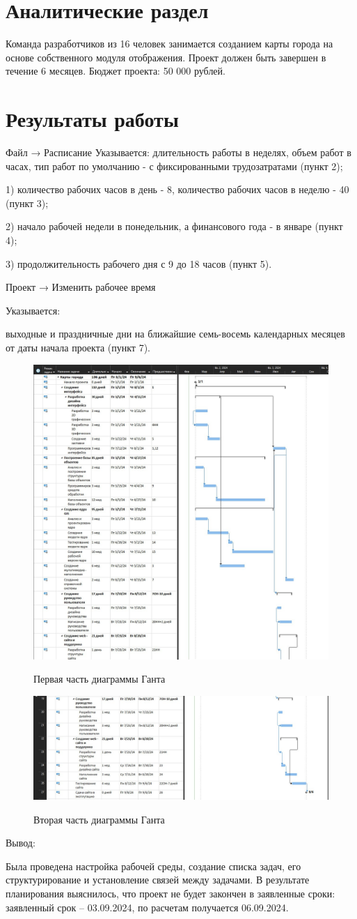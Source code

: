 \section{Аналитические раздел}

Команда разработчиков из 16 человек занимается созданием карты города на основе собственного модуля отображения. Проект должен быть завершен в течение 6 месяцев. Бюджет проекта: 50 000 рублей.

\section{Результаты работы}

Файл → Расписание
Указывается:
длительность работы в неделях, объем работ в часах, тип работ по умолчанию - с фиксированными трудозатратами (пункт 2);

1) количество рабочих часов в день - 8, количество рабочих часов в неделю - 40 (пункт 3);

2) начало рабочей недели в понедельник, а финансового года - в январе (пункт 4);

3) продолжительность рабочего дня с 9 до 18 часов (пункт 5).	

Проект → Изменить рабочее время

Указывается:

выходные и праздничные дни на ближайшие семь-восемь календарных месяцев от даты начала проекта (пункт 7).

\begin{figure}[ht!]
	\includegraphics[width=0.75\linewidth]{assets/images/res1.jpg}
	\label{fig:r2}
	\caption{Первая часть диаграммы Ганта}
\end{figure}
\FloatBarrier
\begin{figure}[ht!]
	\includegraphics[width=0.75\linewidth]{assets/images/res2.jpg}
	\label{fig:r2}
	\caption{Вторая часть диаграммы Ганта}
\end{figure}
\FloatBarrier
Вывод:

Была проведена настройка рабочей среды, создание списка задач, его структурирование и установление связей между задачами.
В результате планирования выяснилось, что проект не будет закончен в заявленные сроки: заявленный срок – 03.09.2024, по расчетам получается 06.09.2024.